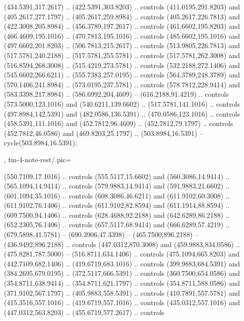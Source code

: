 {{\begin{scope}[y=-0.80pt,x=0.80pt,scale=0.038,xshift=-390pt,yshift=280pt]
        (434.5391,317.2617) .. (422.5391,303.8203) .. controls (411.0195,291.8203) and
        (405.2617,277.1797) .. (405.2617,259.8984) .. controls (405.2617,226.7813) and
        (422.3008,205.8984) .. (456.3789,197.2617) .. controls (461.6602,195.8203) and
        (466.4609,195.1016) .. (470.7813,195.1016) .. controls (485.6602,195.1016) and
        (497.6602,201.8203) .. (506.7813,215.2617) .. controls (513.9805,226.7813) and
        (517.5781,240.2188) .. (517.5781,255.5781) .. controls (517.5781,262.3008) and
        (516.8594,268.3008) .. (515.4219,273.5781) .. controls (532.2188,272.1406) and
        (545.6602,266.6211) .. (555.7383,257.0195) .. controls (564.3789,248.3789) and
        (570.1406,241.8984) .. (573.0195,237.5781) .. controls (578.7812,228.9414) and
        (583.3398,217.8984) .. (586.6992,204.4609) -- (616.2188,91.4219) .. controls
        (573.5000,123.1016) and (540.6211,139.6602) .. (517.5781,141.1016) .. controls
        (497.8984,142.5391) and (482.0586,136.5391) .. (470.0586,123.1016) .. controls
        (458.5391,111.1016) and (452.7812,96.4609) .. (452.7812,79.1797) .. controls
        (452.7812,46.0586) and (469.8203,25.1797) .. (503.8984,16.5391) --
        cycle(503.8984,16.5391);
    \end{scope}
  },
  tm-4-note-rest/.pic={
    \begin{scope}[y=-0.80pt,x=0.80pt,scale=0.038,xshift=-420pt,yshift=280pt]
       (550.7109,17.1016) .. controls (555.5117,15.6602)
      and (560.3086,14.9414) .. (565.1094,14.9414) .. controls (579.9883,14.9414)
      and (591.9883,21.6602) .. (601.1094,35.1016) .. controls (608.3086,46.6211)
      and (611.9102,60.3008) .. (611.9102,76.1406) .. controls (611.9102,82.8594)
      and (611.1914,88.8594) .. (609.7500,94.1406) .. controls (628.4688,92.2188)
      and (642.6289,86.2188) .. (652.2305,76.1406) .. controls (657.5117,68.9414)
      and (666.6289,57.4219) .. (679.5898,41.5781) -- (690.3906,47.3398) --
      (465.7500,896.2188) -- (436.9492,896.2188) .. controls (447.0312,870.3008) and
      (459.9883,834.0586) .. (475.8281,787.5000) -- (516.8711,634.1406) .. controls
      (475.1094,665.8203) and (442.7109,682.1406) .. (419.6719,683.1016) .. controls
      (399.9883,684.5391) and (384.2695,679.0195) .. (372.5117,666.5391) .. controls
      (360.7500,654.0586) and (354.8711,638.9414) .. (354.8711,621.1797) .. controls
      (354.8711,588.0586) and (371.9102,567.1797) .. (405.9883,558.5391) .. controls
      (410.7891,557.5781) and (415.3516,557.1016) .. (419.6719,557.1016) .. controls
      (435.0312,557.1016) and (447.0312,563.8203) .. (455.6719,577.2617) .. controls

\end{scope}}}
